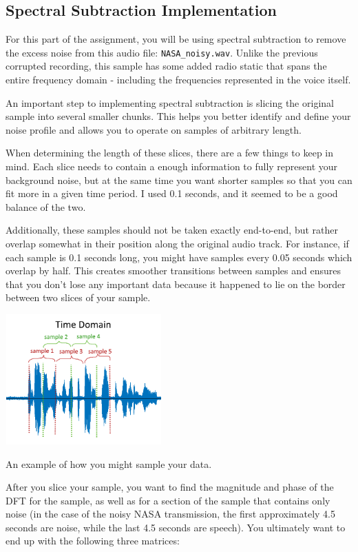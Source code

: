 \documentclass{tufte-handout}
\begin{document}
\subsection{Spectral Subtraction Implementation}
For this part of the assignment, you will be using spectral subtraction to remove the excess noise from this audio file: \verb|NASA_noisy.wav|. Unlike the previous corrupted recording, this sample has some added radio static that spans the entire frequency domain - including the frequencies represented in the voice itself.

An important step to implementing spectral subtraction is slicing the original sample into several smaller chunks. This helps you better identify and define your noise profile and allows you to operate on samples of arbitrary length.

When determining the length of these slices, there are a few things to keep in mind. Each slice needs to contain a enough information to fully represent your background noise, but at the same time you want shorter samples so that you can fit more in a given time period. I used 0.1 seconds, and it seemed to be a good balance of the two.

Additionally, these samples should not be taken exactly end-to-end, but rather overlap somewhat in their position along the original audio track. For instance, if each sample is 0.1 seconds long, you might have samples every 0.05 seconds which overlap by half. This creates smoother transitions between samples and ensures that you don't lose any important data because it happened to lie on the border between two slices of your sample.

\begin{marginfigure}
    \centering
    \includegraphics[width = 6cm, height = 5cm]{sample_1.png}
    \label{fig:sample_data_1}
\caption{An example of how you might sample your data.}
\end{marginfigure}

After you slice your sample, you want to find the magnitude and phase of the DFT for the sample, as well as for a section of the sample that contains only noise (in the case of the noisy NASA transmission, the first approximately 4.5 seconds are noise, while the last 4.5 seconds are speech). You ultimately want to end up with the following three matrices:
\end{document}
